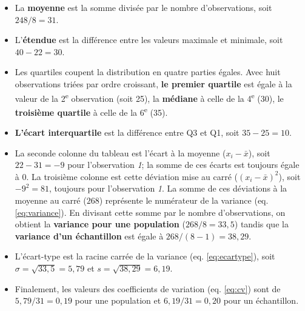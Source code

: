 \documentclass[
  11pt,
  french,
]{book}
\begin{document}
\begin{itemize}
\item
  La \textbf{moyenne} est la somme divisée par le nombre d'observations, soit \(248/8=31\).
\item
  L'\textbf{étendue} est la différence entre les valeurs maximale et minimale, soit \(40-22=30\).
\item
  Les quartiles coupent la distribution en quatre parties égales. Avec huit observations triées par ordre croissant, \textbf{le premier quartile} est égale à la valeur de la 2\textsuperscript{e} observation (soit 25), la \textbf{médiane} à celle de la 4\textsuperscript{e} (30), le \textbf{troisième quartile} à celle de la 6\textsuperscript{e} (35).
\item
  \textbf{L'écart interquartile} est la différence entre Q3 et Q1, soit \(35-25=10\).
\item
  La seconde colonne du tableau est l'écart à la moyenne (\(x_i-\bar{x}\)), soit \(22 - 31 = -9\) pour l'observation \emph{1}; la somme de ces écarts est toujours égale à 0. La troisième colonne est cette déviation mise au carré (\((x_i-\bar{x})^2\)), soit \(-9^2 = 81\), toujours pour l'observation \emph{1}. La somme de ces déviations à la moyenne au carré (\(268\)) représente le numérateur de la variance (eq. \eqref{eq:variance}). En divisant cette somme par le nombre d'observations, on obtient la \textbf{variance pour une population} (\(268/8=33,5\)) tandis que la \textbf{variance d'un échantillon} est égale à \(268/(8-1)=38,29\).
\item
  L'écart-type est la racine carrée de la variance (eq. \eqref{eq:ecartype}), soit \(\sigma=\sqrt{33,5}=5,79\) et \(s=\sqrt{38,29}=6,19\).
\item
  Finalement, les valeurs des coefficients de variation (eq. \eqref{eq:cv}) sont de \(5,79/31=0,19\) pour une population et \(6,19/31=0,20\) pour un échantillon.
\end{itemize}
\end{document}
